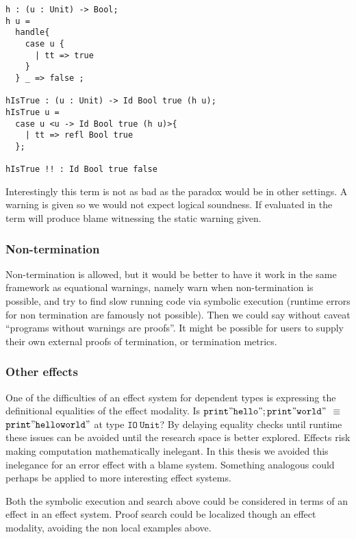 \begin{lstlisting}
h : (u : Unit) -> Bool;
h u =
  handle{
    case u {
      | tt => true
    }
  } _ => false ;

hIsTrue : (u : Unit) -> Id Bool true (h u);
hIsTrue u =
  case u <u -> Id Bool true (h u)>{
    | tt => refl Bool true
  };

hIsTrue !! : Id Bool true false
\end{lstlisting}

Interestingly this term is not as bad as the paradox would be in other settings.
A warning is given so we would not expect logical soundness.
If evaluated in \whnf{} the term will produce blame witnessing the static warning given.


\subsubsection{Non-termination}

Non-termination is allowed, but it would be better to have it work in the same framework as equational warnings, namely warn when non-termination is possible, and try to find slow running code via symbolic execution (runtime errors for non termination are famously not possible).
Then we could say without caveat ``programs without warnings are proofs''.
It might be possible for users to supply their own external proofs of termination\cite{casinghino2014combining}, or termination metrics.

\subsubsection{Other effects}

One of the difficulties of an effect system for dependent types is expressing the definitional equalities of the effect modality.
Is $\mathtt{print"hello";print"world"}$ $\equiv$ $\mathtt{print"helloworld"}$ at type $\mathtt{IO\ Unit}$?
By delaying equality checks until runtime these issues can be avoided until the research space is better explored.
Effects risk making computation mathematically inelegant.
In this thesis we avoided this inelegance for an error effect with a blame system.
Something analogous could perhaps be applied to more interesting effect systems.

Both the symbolic execution and search above could be considered in terms of an effect in an effect system.
Proof search could be localized though an effect modality, avoiding the non local examples above.

